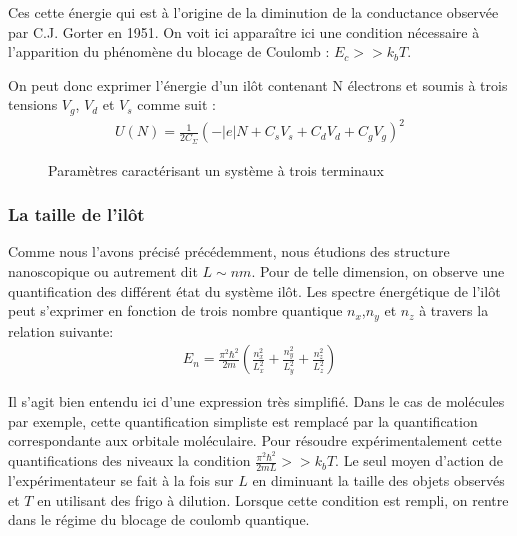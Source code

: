 Ces cette énergie qui est à l'origine de la diminution de la conductance observée par C.J. Gorter en 1951. On voit ici appara\^itre ici une condition nécessaire à l'apparition du phénomène du blocage de Coulomb : $E_c >> k_bT$.

On peut donc exprimer l'énergie d'un il\^ot contenant N électrons et soumis à trois tensions $V_g$, $V_d$ et $V_s$ comme suit :
\begin{eqnarray}
U(N) = \frac{1}{2C_{\Sigma}} (-|e|N + C_sV_s + C_dV_d + C_gV_g)^2
\end{eqnarray}

\begin{figure}
\caption{Paramètres caractérisant un système à trois terminaux}
\label{description_systeme}
\end{figure}



\subsubsection{La taille de l'il\^ot}
Comme nous l'avons précisé précédemment, nous étudions des structure nanoscopique ou autrement dit $L\sim nm$. Pour de telle dimension, on observe une quantification des différent état du système il\^ot. Les spectre énergétique de l'il\^ot peut s'exprimer en fonction de trois nombre quantique $n_x$,$n_y$ et $n_z$ à travers la relation suivante:
\begin{eqnarray}
E_n = \frac{\pi^2 \hbar^2}{2m}(\frac{n_x^2}{L_x^2} + \frac{n_y^2}{L_y^2} + \frac{n_z^2}{L_z^2}) \nonumber
\end{eqnarray}


Il s'agit bien entendu ici d'une expression très simplifié. Dans le cas de molécules par exemple, cette quantification simpliste est remplacé par la quantification correspondante aux orbitale moléculaire. Pour résoudre expérimentalement cette quantifications des niveaux la condition $\frac{\pi^2 \hbar^2}{2mL} >> k_bT$. Le seul moyen d'action de l'expérimentateur se fait à la fois sur $L$ en diminuant la taille des objets observés et $T$ en utilisant des frigo à dilution. Lorsque cette condition est rempli, on rentre dans le régime du blocage de coulomb quantique.
\newline



